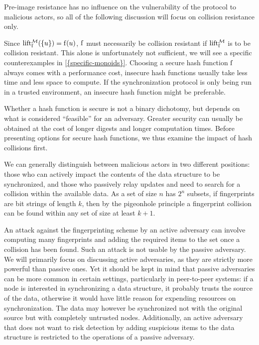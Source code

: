 Pre-image resistance has no influence on the vulnerability of the protocol to malicious actors, so all of the following discussion will focus on collision resistance only.

Since $\operatorname{lift_{\operatorname{f}}^{\mathcal{M}}}(\{u\}) = \operatorname{f}(u)$, $\operatorname{f}$ must necessarily be collision resistant if $\operatorname{lift_{\operatorname{f}}^{\mathcal{M}}}$ is to be collision resistant. This alone is unfortunately not sufficient, we will see a specific counterexamples in \cref{{specific-monoids}}. Choosing a secure hash function $\operatorname{f}$ always comes with a performance cost, insecure hash functions usually take less time and less space to compute. If the synchronization protocol is only being run in a trusted environment, an insecure hash function might be preferable.

Whether a hash function is secure is not a binary dichotomy, but depends on what is considered ``feasible'' for an adversary. Greater security can usually be obtained at the cost of longer digests and longer computation times. Before presenting options for secure hash functions, we thus examine the impact of hash collisions first.

We can generally distinguish between malicious actors in two different positions: those who can actively impact the contents of the data structure to be synchronized, and those who passively relay updates and need to search for a collision within the available data. As a set of size $n$ has $2^n$ subsets, if fingerprints are bit strings of length $k$, then by the pigeonhole principle a fingerprint collision can be found within any set of size at least $k + 1$.

An attack against the fingerprinting scheme by an active adversary can involve computing many fingerprints and adding the required items to the set once a collision has been found. Such an attack is not usable by the passive adversary. We will primarily focus on discussing active adversaries, as they are strictly more powerful than passive ones. Yet it should be kept in mind that passive adversaries can be more common in certain settings, particularly in peer-to-peer systems: if a node is interested in synchronizing a data structure, it probably trusts the source of the data, otherwise it would have little reason for expending resources on synchronization. The data may however be synchronized not with the original source but with completely untrusted nodes. Additionally, an active adversary that does not want to risk detection by adding suspicious items to the data structure is restricted to the operations of a passive adversary.

